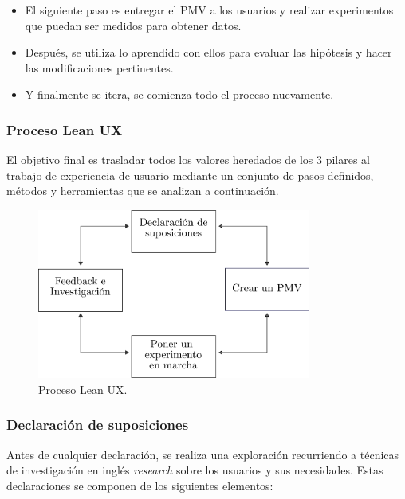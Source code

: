 \begin{enumerate}
\begin{itemize}
    \item El siguiente paso es entregar el PMV a los usuarios y realizar experimentos que puedan ser medidos para obtener datos.
    \item Después, se utiliza lo aprendido con ellos para evaluar las hipótesis y hacer las modificaciones pertinentes.
    \item Y finalmente se itera, se comienza todo el proceso nuevamente. 
    \end{itemize} 


\end{enumerate}

\subsubsection{Proceso Lean UX}
El objetivo final es trasladar todos los valores heredados de los 3 pilares al trabajo de experiencia de usuario mediante un conjunto de pasos definidos, métodos y herramientas que se analizan a continuación.

\begin{figure}[h]
    \includegraphics[width=9cm]{Img/Desarrollo/desarrollo1.png}
    \centering
    \caption{\footnotesize{Proceso Lean UX. }}
    \label{fig:leanux1}
\end{figure}
    
\subsubsection{Declaración de suposiciones}
Antes de cualquier declaración, se realiza una exploración  recurriendo a técnicas de investigación en inglés \textit{\gls{research}} \citep{sharon2016validating} sobre los usuarios y sus necesidades. Estas declaraciones se componen de los siguientes elementos:


